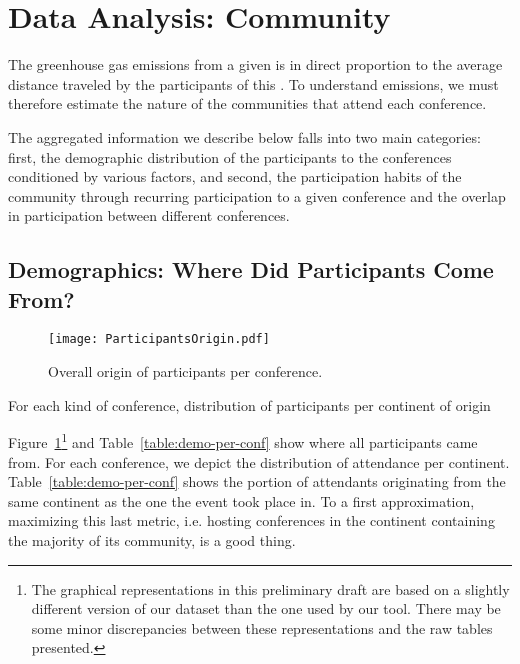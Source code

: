 \section{Data Analysis: Community}
\label{sec:community}

The greenhouse gas emissions from a given \event is in direct proportion to
the average distance traveled by the participants of this \event.
To understand emissions, we must therefore estimate the nature of the
communities that attend each conference. 

The aggregated information we describe below falls into two main categories:
first, the demographic distribution of the participants to the conferences
conditioned by various factors, and second, the participation habits of the
community through recurring participation to a given conference and the
overlap in participation between different conferences.


\subsection{Demographics: Where Did Participants Come From?}
\label{subsec:demo}

\begin{figure}
  \centering
  \texttt{[image: ParticipantsOrigin.pdf]}
  \caption{Overall origin of participants per conference.}
  \label{fig:demo-per-conf}
\end{figure}

\begin{table}
\caption{For each kind of conference, distribution of participants per continent of origin}
\label{table:demo-per-conf}
\end{table}


Figure~\ref{fig:demo-per-conf}\footnote{The graphical representations in this preliminary draft are based on a slightly different version of our dataset than the one used by our tool. There may be some minor discrepancies between these representations and the raw tables presented.} and Table~\ref{table:demo-per-conf} show
where all participants came from. For each conference, we depict the
distribution of attendance per continent. Table~\ref{table:demo-per-conf}
shows the portion of attendants originating from the same continent as the
one the event took place in. To a first approximation, maximizing this last
metric, i.e. hosting conferences in the continent containing the majority of
its community, is a good thing.

